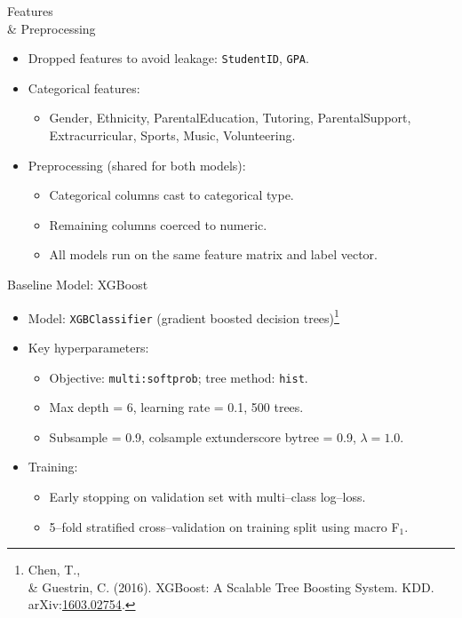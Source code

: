 \documentclass[aspectratio=169]{beamer}
\begin{document}
\begin{frame}{Features \\ \& Preprocessing}
  \begin{itemize}
    \item Dropped features to avoid leakage: \texttt{StudentID}, \texttt{GPA}.
    \item Categorical features:
    \begin{itemize}
      \item Gender, Ethnicity, ParentalEducation, Tutoring, ParentalSupport, Extracurricular,
      Sports, Music, Volunteering.
    \end{itemize}
    \item Preprocessing (shared for both models):
    \begin{itemize}
      \item Categorical columns cast to categorical type.
      \item Remaining columns coerced to numeric.
      \item All models run on the same feature matrix and label vector.
    \end{itemize}
  \end{itemize}
\end{frame}

\begin{frame}{Baseline Model: XGBoost}
  \begin{itemize}
    \item Model: \texttt{XGBClassifier} (gradient boosted decision trees)\footnote{Chen, T., \\& Guestrin, C. (2016). XGBoost: A Scalable Tree Boosting System. KDD. arXiv:\href{https://arxiv.org/abs/1603.02754}{1603.02754}.}
    \item Key hyperparameters:
    \begin{itemize}
      \item Objective: \texttt{multi:softprob}; tree method: \texttt{hist}.
      \item Max depth = 6, learning rate = 0.1, 500 trees.
      \item Subsample = 0.9, colsample	extunderscore bytree = 0.9, \(\lambda = 1.0\).
    \end{itemize}
    \item Training:
    \begin{itemize}
      \item Early stopping on validation set with multi--class log--loss.
      \item 5--fold stratified cross--validation on training split using macro F$_1$.
    \end{itemize}
  \end{itemize}
\end{frame}
\end{document}
